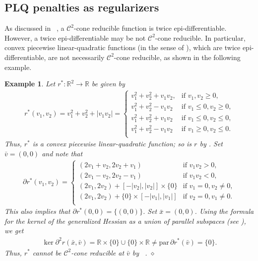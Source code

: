 \documentclass[reqno]{amsart}
\newtheorem{example}[proposition]{Example}
\numberwithin{equation}{section}
\newcommand{\R}{\mathbb{R}}
\newcommand{\para}{\mathrm{par}\,}
\begin{document}
\subsection{PLQ penalties as  regularizers}\label{sec:PLQ}

As discussed in ~, a $\mathcal{C}^2$-cone reducible function is twice epi-differentiable. However, a twice epi-differentiable may be not $\mathcal{C}^2$-cone reducible. In particular,  convex piecewise linear-quadratic functions (in the sense of \cite[Definition 10.20]{RoW 98}), which are twice epi-differentiable, are not necessarily $\mathcal{C}^2$-cone reducible,
as shown in the following example.

\begin{example} 
    Let $r^* : \R^2 \to \R$ be given by \begin{align*}
        r^*(v_1, v_2) = v_1^2 + v_2^2 + |v_1v_2|=\begin{cases} v_1^2 + v_2^2 + v_1v_2, & \text{if }v_1,v_2\ge 0,\\
        v_1^2 + v_2^2 - v_1v_2 & \text{if }v_1\le0,v_2\ge 0,\\
        v_1^2 + v_2^2 + v_1v_2 & \text{if }v_1\le0,v_2\le 0,\\
        v_1^2 + v_2^2 - v_1v_2 & \text{if }v_1\ge0,v_2\le 0.\\
        \end{cases}
    \end{align*}
Thus, $r^*$ is a convex piecewise linear-quadratic function; so is $r$ by \cite[Theorem 11.14]{RoW 98}.
Set $\bar{v} = (0, 0)$ and note that
    \begin{align*}
    \partial r^*(v_1, v_2) = \begin{cases}
    (2v_1 + v_2, 2v_2 + v_1) & \text{if } v_1v_2 > 0, \\
    (2v_1 - v_2, 2v_2 - v_1) & \text{if } v_1v_2 < 0, \\
    (2v_1, 2v_2) + [-|v_2|, |v_2|] \times \{0\} & \text{if } v_1 = 0, v_2 \not = 0, \\
    (2v_1, 2v_2) + \{0\} \times [-|v_1|, |v_1|]  & \text{if } v_2 = 0, v_1 \not = 0. \\
    \end{cases}
\end{align*}
This also implies that $\partial r^* (0,0) = \{(0,0)\}$. Set $\bar{x} = (0,0)$. Using the formula for the kernel of the generalized Hessian as a union of parallel subspaces (see \cite[Theorem 4.1]{RM 11}), 
we get \begin{align}
    \ker \partial^2 r(\bar{x}, \bar{v}) = \R \times \{0\} \cup \{0\} \times \R \not = \para \partial r^* (\bar{v}) = \{0\}.
\end{align}
Thus, $r^*$ cannot be $\mathcal{C}^2$-cone reducible at $\bar{v}$ by ~.
    \hfill $\diamond$
\end{example} 
\end{document}
